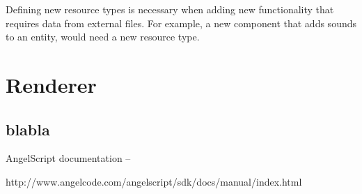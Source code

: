 \documentclass[a4paper, 12pt]{report}
\begin{document}
Defining new resource types is necessary when adding new functionality that requires data from external files. For example, a new component that adds sounds to an entity, would need a new resource type.

\chapter{Renderer}

\section{blabla}


\begin{thebibliography}{9}
AngelScript documentation -- 

http://www.angelcode.com/angelscript/sdk/docs/manual/index.html

\end{thebibliography}

\clearpage
{}
\listoffigures

\clearpage
{}
\listoftables
\end{document}

